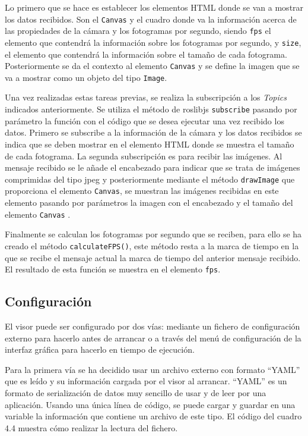 Lo primero que se hace es establecer los elementos HTML donde se van a mostrar los datos recibidos. Son el \texttt{Canvas} y el cuadro donde va la información acerca de las propiedades de la cámara y los fotogramas por segundo, siendo \texttt{fps} el elemento que contendrá la información sobre los fotogramas por segundo, y \texttt{size}, el elemento que contendrá la información sobre el tamaño de cada fotograma. Posteriormente se da el contexto al elemento \texttt{Canvas}  y se define la imagen que se va a mostrar como un objeto del tipo \texttt{Image}.

Una vez realizadas estas tareas previas, se realiza la subscripción a los \textit{Topics} indicados anteriormente. Se utiliza el método de roslibjs \texttt{subscribe} pasando por parámetro la función con el código que se desea ejecutar una vez recibido los datos. Primero se subscribe a la información de la cámara y los datos recibidos se indica que se deben mostrar en el elemento HTML donde se muestra el tamaño de cada fotograma.
La segunda subscripción es para recibir las imágenes. Al mensaje recibido se le añade el encabezado para indicar que se trata de imágenes comprimidas del tipo jpeg y posteriormente mediante el método \texttt{drawImage} que proporciona el elemento \texttt{Canvas}, se muestran las imágenes recibidas en este elemento pasando por parámetros la imagen con el encabezado y el tamaño del elemento \texttt{Canvas} .

Finalmente se calculan los fotogramas por segundo que se reciben, para ello se ha creado el método \texttt{calculateFPS()}, este método resta a la marca de tiempo en la que se recibe el mensaje actual la marca de tiempo del anterior mensaje recibido. El resultado de esta función se muestra en el elemento \texttt{fps}.

\subsection{Configuración}
El visor puede ser configurado por dos vías: mediante un fichero de configuración externo para hacerlo antes de arrancar o a través del menú de configuración de la interfaz gráfica para hacerlo en tiempo de ejecución.

Para la primera vía se ha decidido usar un archivo externo con formato ``YAML'' que es leído y su información cargada por el visor al arrancar. ``YAML'' es un formato de serialización de datos muy sencillo de usar y de leer por una aplicación. Usando una única línea de código, se puede cargar y guardar en una variable la información que contiene un archivo de este tipo. El código del cuadro 4.4 muestra cómo realizar la lectura del fichero.

